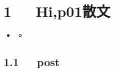 \documentclass[letterpaper,12pt,english]{sphinxmanual}
\begin{document}
\chapter{1   Hi,p01散文}
\label{\detokenize{p01_u6563_u6587/Hello_uff0cp01_u6563_u6587:hi-p01}}\label{\detokenize{p01_u6563_u6587/Hello_uff0cp01_u6563_u6587::doc}}
\begin{sphinxShadowBox}
\begin{itemize}
\item {} 
\label{\detokenize{p01_u6563_u6587/Hello_uff0cp01_u6563_u6587:id2}}{\hyperref[\detokenize{p01_u6563_u6587/Hello_uff0cp01_u6563_u6587:hi-p01}]{}}
\begin{itemize}
\item {} 
\label{\detokenize{p01_u6563_u6587/Hello_uff0cp01_u6563_u6587:id3}}{\hyperref[\detokenize{p01_u6563_u6587/Hello_uff0cp01_u6563_u6587:post}]{}}

\end{itemize}

\end{itemize}
\end{sphinxShadowBox}


\section{1.1   post}
\label{\detokenize{p01_u6563_u6587/Hello_uff0cp01_u6563_u6587:post}}
\end{document}
